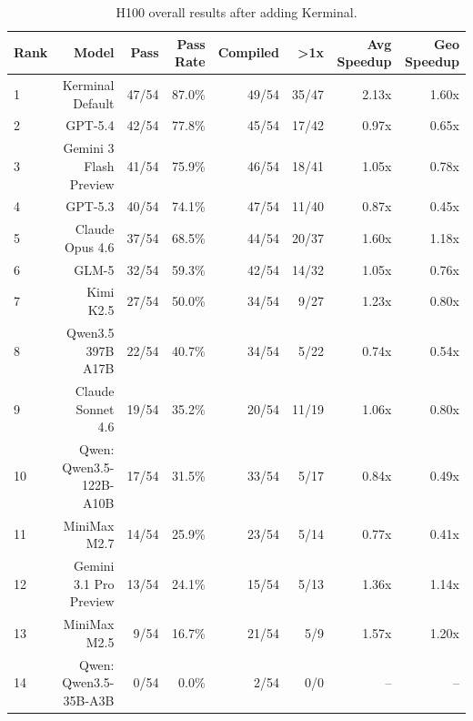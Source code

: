 \begin{table}[t]
\centering
\small
\caption{H100 overall results after adding Kerminal.}
\label{tab:h100-overall}
\begin{tabular}{lrrrrrrr}
\toprule
Rank & Model & Pass & Pass Rate & Compiled & >1x & Avg Speedup & Geo Speedup \\
\midrule
1 & Kerminal Default & 47/54 & 87.0\% & 49/54 & 35/47 & 2.13x & 1.60x \\
2 & GPT-5.4 & 42/54 & 77.8\% & 45/54 & 17/42 & 0.97x & 0.65x \\
3 & Gemini 3 Flash Preview & 41/54 & 75.9\% & 46/54 & 18/41 & 1.05x & 0.78x \\
4 & GPT-5.3 & 40/54 & 74.1\% & 47/54 & 11/40 & 0.87x & 0.45x \\
5 & Claude Opus 4.6 & 37/54 & 68.5\% & 44/54 & 20/37 & 1.60x & 1.18x \\
6 & GLM-5 & 32/54 & 59.3\% & 42/54 & 14/32 & 1.05x & 0.76x \\
7 & Kimi K2.5 & 27/54 & 50.0\% & 34/54 & 9/27 & 1.23x & 0.80x \\
8 & Qwen3.5 397B A17B & 22/54 & 40.7\% & 34/54 & 5/22 & 0.74x & 0.54x \\
9 & Claude Sonnet 4.6 & 19/54 & 35.2\% & 20/54 & 11/19 & 1.06x & 0.80x \\
10 & Qwen: Qwen3.5-122B-A10B & 17/54 & 31.5\% & 33/54 & 5/17 & 0.84x & 0.49x \\
11 & MiniMax M2.7 & 14/54 & 25.9\% & 23/54 & 5/14 & 0.77x & 0.41x \\
12 & Gemini 3.1 Pro Preview & 13/54 & 24.1\% & 15/54 & 5/13 & 1.36x & 1.14x \\
13 & MiniMax M2.5 & 9/54 & 16.7\% & 21/54 & 5/9 & 1.57x & 1.20x \\
14 & Qwen: Qwen3.5-35B-A3B & 0/54 & 0.0\% & 2/54 & 0/0 & -- & -- \\
\bottomrule
\end{tabular}
\end{table}
